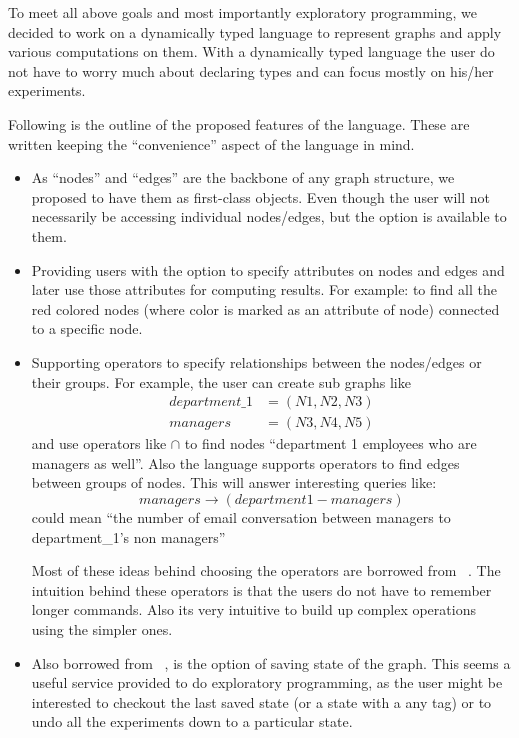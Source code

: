 \documentclass[12,twoside]{article}
\begin{document}
   To meet all above goals and most importantly exploratory programming, we decided 
     to work on a dynamically typed language to represent graphs
     and apply various computations on them.
     With a dynamically typed language the user do not have to worry much about declaring types and can
     focus mostly on his/her experiments.

 Following is the outline of the proposed features
 of the language. These are written keeping the
 ``convenience'' aspect of the language in mind.

 \begin{itemize}
   \item As ``nodes'' and ``edges'' are the backbone of any graph structure, we proposed to have them as 
  first-class objects. Even though the user will not necessarily
  be accessing individual nodes/edges, but the option is available to them.
  \item Providing users with the option to specify attributes on nodes and edges and later use
  those attributes for computing results. For example: to find all the red colored nodes (where color is marked as an attribute of
      node) connected to a specific node.
  \item Supporting  operators to specify relationships between the nodes/edges or their groups.
  For example, the user can create sub graphs like
  \begin{align}
          department\_1 &= (N1,N2,N3) \\
          managers &= (N3,N4,N5) 
  \end{align}
  and use operators like $\cap$ to find
  nodes ``department 1 employees who are managers as well''.
  Also the language supports operators to find edges between groups of nodes. 
  This will answer interesting queries like:
  $$managers \rightarrow  (department 1 - managers) $$ could mean
  ``the number of email conversation between managers to department\_1's non managers''

  Most of these ideas
  behind choosing the operators are borrowed from ~\cite{Adar}.  
  The intuition behind these operators is that the users do not have to remember longer 
  commands. Also its very intuitive to build up complex operations using the simpler ones.

   \item Also borrowed from ~\cite{Adar}, is the option of saving state of the graph.
     This seems a useful service provided to do exploratory programming, as the user might be interested to 
     checkout the last saved state  (or a state with a any tag) or to undo all the experiments
     down to a particular state.

  \end{itemize}
     
\end{document}
